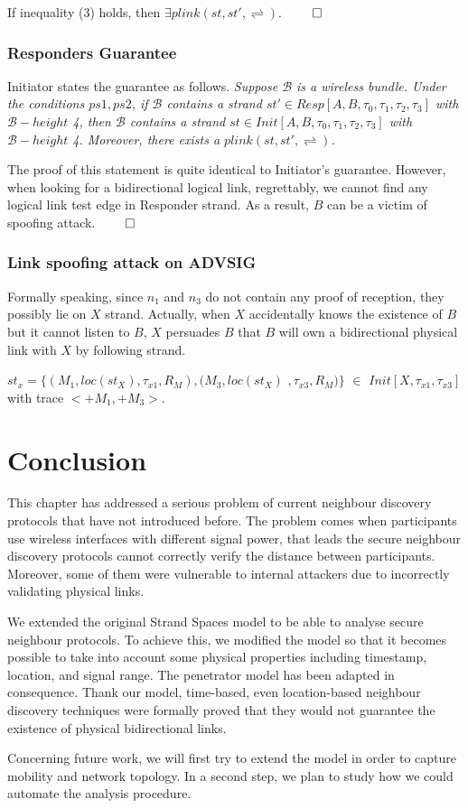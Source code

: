 If inequality (3) holds, then $\exists plink(st,st', \rightleftharpoons)$. $\qed$
  
\subsubsection*{Responders Guarantee}

Initiator states the guarantee as follows.
\emph{
Suppose $\mathcal{B}$ is a wireless bundle. Under the conditions $ps1, ps2$, if $\mathcal{B}$ contains a strand $st' \in Resp[A,B,\tau_0,\tau_1,\tau_2,\tau_3]$ with $\mathcal{B} -height$ 4, then $\mathcal{B}$ contains a strand $st \in Init[A,B,\tau_0,\tau_1,\tau_2,\tau_3]$ with $\mathcal{B} -height$ 4. Moreover, there exists a $plink(st,st',\rightleftharpoons)$. 
}

The proof of this statement is quite identical to Initiator's guarantee. However, when looking for a bidirectional logical link, regrettably, we cannot find any logical link test edge in Responder strand. As a result, $B$ can be a victim of spoofing attack. $\qed$ 
 
\subsubsection*{Link spoofing attack on ADVSIG} 

Formally speaking, since $n_1$ and $n_3$ do not contain any proof of reception, they possibly lie on $X$ strand. Actually, when $X$ accidentally knows the existence of $B$ but it cannot listen to $B$, $X$ persuades $B$ that $B$ will own a bidirectional physical link with $X$ by following strand.  
\begin{flushleft}
$st_x = \{(M_1,loc(st_X),\tau_{x1}, R_M) ,(M_3,loc(st_X)$ $,\tau_{x3}, R_M)\}$ $\in$ $Init[X,\tau_{x1},\tau_{x3}]$ with trace $<+M_1,+M_3>$.
\end{flushleft}

\section{Conclusion}

This chapter has addressed a serious problem of current neighbour discovery protocols that have not introduced before. The problem comes when participants use wireless interfaces with different signal power, that leads the secure neighbour discovery protocols cannot correctly verify the distance between participants. Moreover, some of them were vulnerable to internal attackers due to incorrectly validating physical links.     

We extended the original Strand Spaces model to be able to analyse secure neighbour protocols. To achieve this, we modified the model so that it becomes possible to take into account some physical properties including timestamp, location, and signal range. The penetrator model has been adapted in consequence. Thank our model, time-based, even location-based neighbour discovery techniques were formally proved that they would not guarantee the existence of physical bidirectional links. 

Concerning future work, we will first try to extend the model in order to capture mobility and network topology. In a second step, we plan to study how we could automate the analysis procedure.
